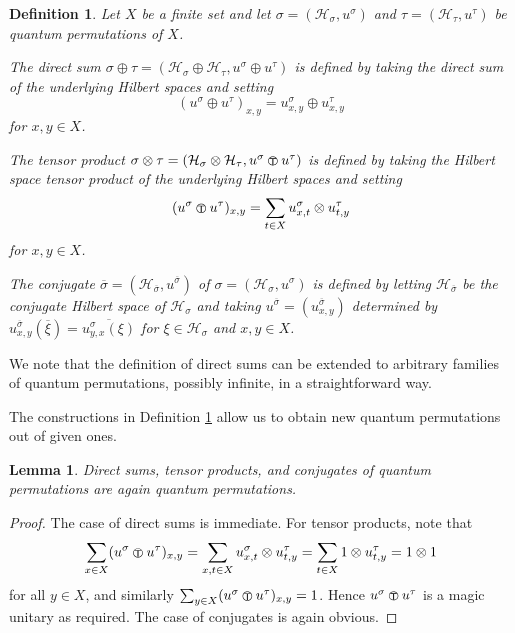 \documentclass[a4paper]{amsart}
\newcommand*{\Hc}{\mathcal{H}}
\newenvironment{bnum}
{\begin{list}{}
    {\setlength{\labelwidth}{15pt}
     \setlength{\leftmargin}{\labelwidth}
    }
}
{\end{list}}
\newcommand{\tp}{\!\!
{\scriptstyle
\text{
\raisebox{0.7pt}{
\textcircled{\raisebox{-1.3pt}{$\mathsf{T}$}}
} 
} 
} 
\!\!}
\numberwithin{equation}{section}
\theoremstyle{change}
\newtheorem{lemma}[theorem]{Lemma}
\newtheorem{definition}[theorem]{Definition}
\begin{document}
\begin{definition} \label{def_constructions}
Let $ X $ be a finite set and let $ \sigma = (\Hc_\sigma, u^\sigma) $ and $ \tau = (\Hc_\tau, u^\tau) $ be quantum permutations of $ X $. 
\begin{bnum}
\item[a)] The direct sum $ \sigma \oplus \tau = (\Hc_\sigma \oplus \Hc_\tau, u^\sigma \oplus u^\tau) $ is defined by taking the direct sum of the underlying 
Hilbert spaces and setting
$$ 
(u^\sigma \oplus u^\tau)_{x,y} = u^\sigma_{x,y} \oplus u^\tau_{x,y} 
$$ 
for $ x,y \in X $. 
\item[b)] The tensor product $ \sigma \otimes \tau = (\Hc_\sigma \otimes \Hc_\tau, u^\sigma \tp u^\tau) $ is defined by taking the Hilbert space tensor product 
of the underlying Hilbert spaces and setting
$$ 
(u^\sigma \tp u^\tau)_{x,y} = \sum_{t \in X} u^\sigma_{x,t} \otimes u^\tau_{t,y} 
$$ 
for $ x,y \in X $. 
\item[c)] The conjugate $ \overline{\sigma} = (\Hc_{\overline{\sigma}}, u^{\overline{\sigma}}) $ of $ \sigma = (\Hc_\sigma, u^\sigma) $ 
is defined by letting $ \Hc_{\overline{\sigma}} $ be the conjugate Hilbert space of $ \Hc_\sigma $ and taking $ u^{\overline{\sigma}} = (u^{\overline{\sigma}}_{x,y}) $ 
determined by $ u^{\overline{\sigma}}_{x,y}(\overline{\xi}) = \overline{u^\sigma_{y,x}(\xi)} $ for $ \xi \in \Hc_\sigma $ and $ x,y \in X $. 
\end{bnum}
\end{definition} 

We note that the definition of direct sums can be extended to arbitrary families of quantum permutations, possibly infinite, in a straightforward way. 

The constructions in Definition \ref{def_constructions} allow us to obtain new quantum permutations out of given ones. 

\begin{lemma} \label{tensorstructure}
Direct sums, tensor products, and conjugates of quantum permutations are again quantum permutations. 
\end{lemma} 

\begin{proof} 
The case of direct sums is immediate. For tensor products, note that  
$$
\sum_{x \in X} (u^\sigma \tp u^\tau)_{x,y} = \sum_{x, t \in X} u^\sigma_{x,t} \otimes u^\tau_{t,y} = \sum_{t \in X} 1 \otimes u^\tau_{t,y} = 1 \otimes 1 
$$
for all $ y \in X $, and similarly $ \sum_{y \in X} (u^\sigma \tp u^\tau)_{x,y} = 1 $. Hence $ u^\sigma \tp u^\tau $ is a magic unitary as required. 
The case of conjugates is again obvious. 
\end{proof} 
\end{document}
